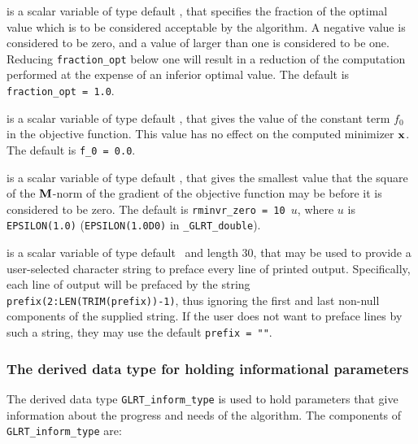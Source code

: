 \documentclass{galahad}
\newcommand{\packagename}{GL\-RT}
\newcommand{\fullpackagename}{\libraryname\_\packagename}
\begin{document}
\begin{description}
 is a scalar variable of type default
\realdp, that specifies the fraction
of the optimal value which is to be considered acceptable by the algorithm.
A negative value is considered to be zero, and a value of larger than one
is considered to be one. Reducing {\tt fraction\_opt} below one will result
in a reduction of the computation performed at the expense of an inferior
optimal value.
The default is {\tt fraction\_opt = 1.0}.

 is a scalar variable of type default
\realdp, that gives the value of the constant term $f_0$ in the
objective function. This value has no effect on the
computed minimizer ${\mathbf{x}}$. The default is {\tt f\_0 = 0.0}.

 is a scalar variable of type default
\realdp, that gives the smallest value that the square of the ${\mathbf{M}}$-norm of
the gradient of the objective function may be before it is considered to be
zero.
The default is {\tt rminvr\_zero = 10 $u$},
where $u$ is {\tt EPSILON(1.0)} ({\tt EPSILON(1.0D0)} in
{\tt \fullpackagename\_double}).

 is a scalar variable of type default \character\
and length 30, that may be used to provide a user-selected
character string to preface every line of printed output.
Specifically, each line of output will be prefaced by the string
{\tt prefix(2:LEN(TRIM(prefix))-1)},
thus ignoring the first and last non-null components of the
supplied string. If the user does not want to preface lines by such
a string, they may use the default {\tt prefix = ""}.

\end{description}


\subsubsection{The derived data type for holding informational
 parameters}\label{typeinfo}
The derived data type
{\tt \packagename\_inform\_type}
is used to hold parameters that give information about the progress and needs
of the algorithm. The components of
{\tt \packagename\_inform\_type}
are:
\end{document}
